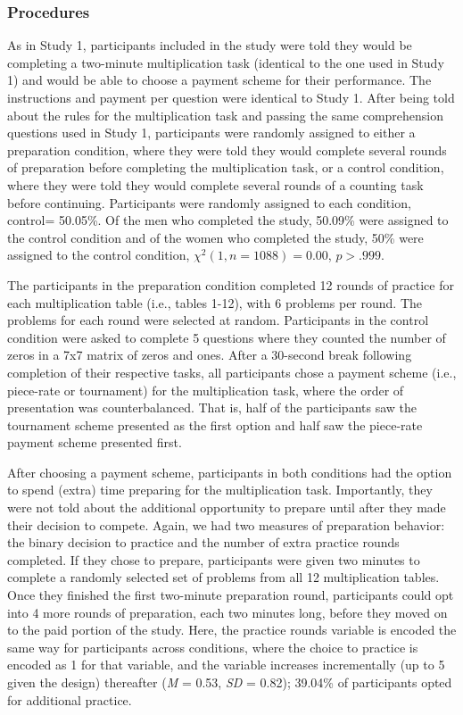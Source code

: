 \documentclass[letterpaper, nobind]{templates/ociamthesis}
\begin{document}
\hypertarget{procedures-1}{%
\subsubsection{Procedures}\label{procedures-1}}

As in Study 1, participants included in the study were told they would be completing a two-minute multiplication task (identical to the one used in Study 1) and would be able to choose a payment scheme for their performance. The instructions and payment per question were identical to Study 1. After being told about the rules for the multiplication task and passing the same comprehension questions used in Study 1, participants were randomly assigned to either a preparation condition, where they were told they would complete several rounds of preparation before completing the multiplication task, or a control condition, where they were told they would complete several rounds of a counting task before continuing. Participants were randomly assigned to each condition, control= 50.05\%. Of the men who completed the study, 50.09\% were assigned to the control condition and of the women who completed the study, 50\% were assigned to the control condition, \(\chi^2(1, n = 1088) = 0.00\), \(p > .999\).

The participants in the preparation condition completed 12 rounds of practice for each multiplication table (i.e., tables 1-12), with 6 problems per round. The problems for each round were selected at random. Participants in the control condition were asked to complete 5 questions where they counted the number of zeros in a 7x7 matrix of zeros and ones. After a 30-second break following completion of their respective tasks, all participants chose a payment scheme (i.e., piece-rate or tournament) for the multiplication task, where the order of presentation was counterbalanced. That is, half of the participants saw the tournament scheme presented as the first option and half saw the piece-rate payment scheme presented first.

After choosing a payment scheme, participants in both conditions had the option to spend (extra) time preparing for the multiplication task. Importantly, they were not told about the additional opportunity to prepare until after they made their decision to compete. Again, we had two measures of preparation behavior: the binary decision to practice and the number of extra practice rounds completed. If they chose to prepare, participants were given two minutes to complete a randomly selected set of problems from all 12 multiplication tables. Once they finished the first two-minute preparation round, participants could opt into 4 more rounds of preparation, each two minutes long, before they moved on to the paid portion of the study. Here, the practice rounds variable is encoded the same way for participants across conditions, where the choice to practice is encoded as 1 for that variable, and the variable increases incrementally (up to 5 given the design) thereafter (\emph{M} = 0.53, \emph{SD} = 0.82); 39.04\% of participants opted for additional practice.
\end{document}
